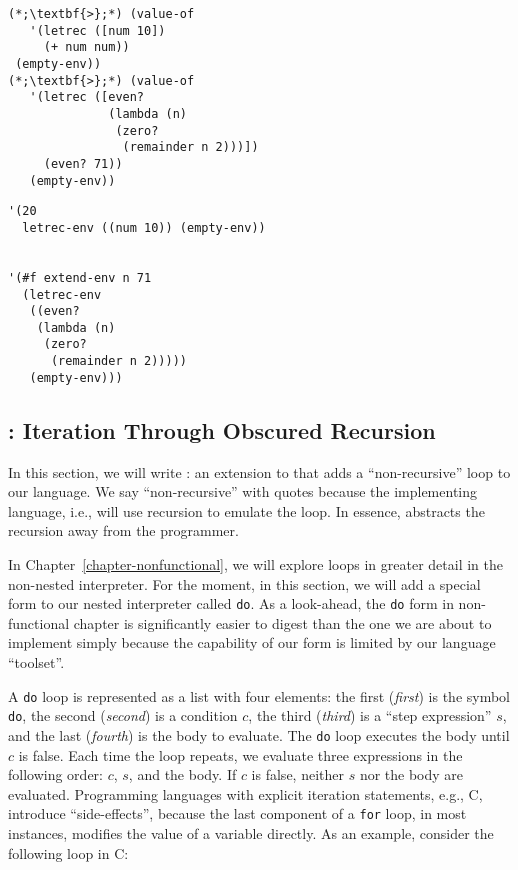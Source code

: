 \begin{cloast}[]{}
\begin{lstlisting}[language=MyNLNSOutput]
(*;\textbf{>};*) (value-of
   '(letrec ([num 10])
     (+ num num))
 (empty-env))
(*;\textbf{>};*) (value-of
   '(letrec ([even?
              (lambda (n)
               (zero? 
                (remainder n 2)))])
     (even? 71))
   (empty-env))
\end{lstlisting}
\tcblower
\begin{lstlisting}[language=MyOutput]
'(20 
  letrec-env ((num 10)) (empty-env))


'(#f extend-env n 71 
  (letrec-env 
   ((even? 
    (lambda (n) 
     (zero? 
      (remainder n 2))))) 
   (empty-env)))
\end{lstlisting}
\end{cloast}

\clearpage
\subsection*{: Iteration Through Obscured Recursion}

In this section, we will write : an extension to  that adds a ``non-recursive'' loop to our language. We say ``non-recursive'' with quotes because the implementing language, i.e.,  will use recursion to emulate the loop. In essence,  abstracts the recursion away from the programmer.

In Chapter~\ref{chapter-nonfunctional}, we will explore loops in greater detail in the non-nested interpreter. For the moment, in this section, we will add a special form to our nested interpreter called \texttt{do}. As a look-ahead, the \texttt{do} form in non-functional chapter is significantly easier to digest than the one we are about to implement simply because the capability of our form is limited by our language ``toolset''. 

A \texttt{do} loop is represented as a list with four elements: the first (\textit{first}) is the symbol \texttt{do}, the second (\textit{second}) is a condition $c$, the third (\textit{third}) is a ``step expression'' $s$, and the last (\textit{fourth}) is the body to evaluate. The \texttt{do} loop executes the body until $c$ is false. Each time the loop repeats, we evaluate three expressions in the following order: $c$, $s$, and the body. If $c$ is false, neither $s$ nor the body are evaluated. Programming languages with explicit iteration statements, e.g., C, introduce ``side-effects'', because the last component of a \texttt{for} loop, in most instances, modifies the value of a variable directly. As an example, consider the following loop in C:

